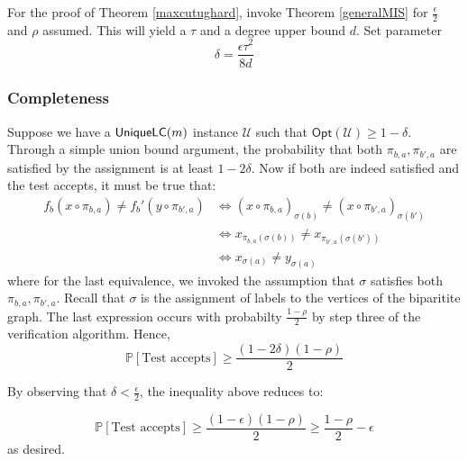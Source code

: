For the proof of Theorem \ref{maxcutughard}, invoke Theorem \ref{generalMIS} for $\frac{\epsilon}{2}$ and $\rho$ assumed. This will yield a $\tau$ and a degree upper bound $d$. Set parameter $$ \delta = \frac{\epsilon \tau^2}{8d} $$


\subsubsection{Completeness}
%
Suppose we have a $\mathsf{UniqueLC}(m)$ instance $\mathcal{U}$ such that $\mathsf{Opt}(\mathcal{U}) \geq 1 - \delta$. Through a simple union bound argument, the probability that both $\pi_{b,a},\pi_{b',a}$ are satisfied by the assignment is at least $1- 2\delta$. Now if both are indeed satisfied and the test accepts, it must be true that:
%
\begin{align*}
    f_b(x \circ \pi_{b,a}) \neq f_b'(y \circ \pi_{b',a}) & \iff
    (x \circ \pi_{b,a})_{\sigma(b)} \neq (x \circ \pi_{b',a})_{\sigma(b')} \\
    & \iff x_ {\pi_{b,a}(\sigma(b))} \neq x_ {\pi_{b',a}(\sigma(b'))} \\
    & \iff x_{\sigma(a)} \neq y_{\sigma(a)}
\end{align*}
where for the last equivalence, we invoked the assumption that $\sigma$ satisfies both $\pi_{b,a},\pi_{b',a}$. Recall that $\sigma$ is the assignment of labels to the vertices of the biparitite graph. The last expression occurs with probabilty $\frac{1 - \rho}{2}$ by step three of the verification algorithm. Hence,
\[ \mathbb{P}[\text{Test accepts}] \geq \frac{(1-2\delta)(1 - \rho)}{2}\]

By observing that $\delta < \frac{\epsilon}{2}$, the inequality above reduces to:

\begin{equation}
  \mathbb{P}[\text{Test accepts}] \geq \frac{(1-\epsilon)(1 - \rho)}{2} \geq \frac{1 - \rho}{2} - \epsilon
\end{equation}
as desired.

